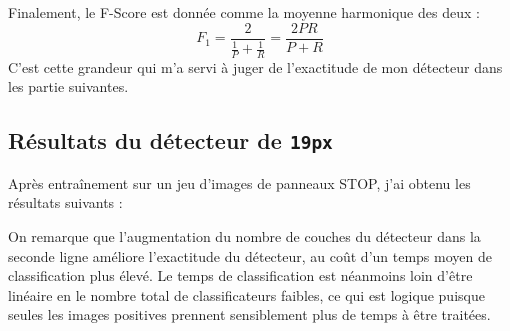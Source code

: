 \documentclass[12pt,a4paper]{article}
\begin{document}
Finalement, le F-Score est donnée comme la moyenne harmonique des deux :
\begin{equation}
    \boxed{F_1 = \frac{2}{\frac{1}{P} + \frac{1}{R}} = \frac{2 P R}{P+R}}
\end{equation}
C'est cette grandeur qui m'a servi à juger de l'exactitude de mon détecteur dans les partie suivantes.

\subsection{Résultats du détecteur de \texttt{19px}}
Après entraînement sur un jeu d'images de panneaux STOP, j'ai obtenu les résultats suivants :
\renewcommand{\arraystretch}{1.3}
\begin{table}[h]
    
\end{table}

On remarque que l'augmentation du nombre de couches du détecteur dans la seconde ligne améliore l'exactitude du détecteur, au coût d'un temps moyen de classification plus élevé. Le temps de classification est néanmoins loin d'être linéaire en le nombre total de classificateurs faibles, ce qui est logique puisque seules les images positives prennent sensiblement plus de temps à être traitées.
\end{document}
